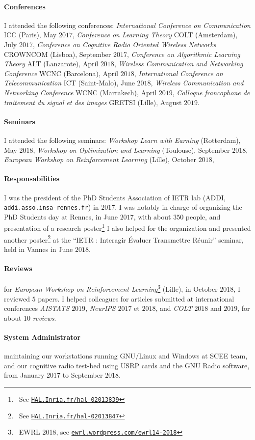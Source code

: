 \paragraph{Conferences}
    I attended the following conferences:
	\emph{International Conference on Communication} ICC (Paris), May $2017$,
    \emph{Conference on Learning Theory} COLT (Amsterdam), July $2017$,
    \emph{Conference on Cognitive Radio Oriented Wireless Networks} CROWNCOM (Lisboa), September $2017$,
    \emph{Conference on Algorithmic Learning Theory} ALT (Lanzarote), April $2018$,
    \emph{Wireless Communication and Networking Conference} WCNC (Barcelona), April $2018$,
	\emph{International Conference on Telecommunication} ICT (Saint-Malo), June $2018$,
    \emph{Wireless Communication and Networking Conference} WCNC (Marrakech), April $2019$,
    \emph{Colloque francophone de traitement du signal et des images} GRETSI (Lille), August $2019$.

\paragraph{Seminars}
    I attended the following seminars:
	\emph{Workshop Learn with Earning} (Rotterdam), May $2018$,
	\emph{Workshop on Optimization and Learning} (Toulouse), September $2018$,
	\emph{European Workshop on Reinforcement Learning} (Lille), October $2018$,

\paragraph{Responsabilities}
    I was the president of the PhD Students Association of IETR lab (ADDI, \texttt{addi.asso.insa-rennes.fr}) in $2017$.
    I was notably in charge of organizing the PhD Students day at Rennes, in June $2017$, with about $350$ people, and presentation of a research poster\footnote{~See \href{https://HAL.Inria.fr/hal-02013839}{\texttt{HAL.Inria.fr/hal-02013839}}}
    I also helped for the organization and presented another poster\footnote{~See \href{https://HAL.Inria.fr/hal-02013847}{\texttt{HAL.Inria.fr/hal-02013847}}} at the ``IETR : Interagir Évaluer Transmettre Réunir'' seminar, held in Vannes in June $2018$.

\paragraph{Reviews}
	for \emph{European Workshop on Reinforcement Learning}\footnote{~EWRL 2018, see \href{https://ewrl.wordpress.com/ewrl14-2018}{\texttt{ewrl.wordpress.com/ewrl14-2018}}} (Lille), in October $2018$, I reviewed $5$ papers.
	I helped colleagues for articles submitted at international conferences \emph{AISTATS} $2019$, \emph{NeurIPS} $2017$ et $2018$, and \emph{COLT} $2018$ and $2019$, for about 10 \emph{reviews}.

\paragraph{System Administrator}
	maintaining our workstations running GNU/Linux and Windows
	at SCEE team,
	and our cognitive radio test-bed using USRP cards and the GNU Radio software,
	from January $2017$ to September $2018$.

